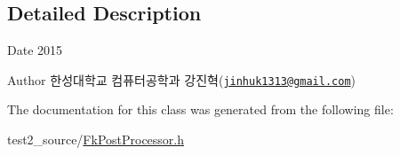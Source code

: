 \subsection{Detailed Description}
\begin{DoxyDate}{Date}
2015 
\end{DoxyDate}
\begin{DoxyAuthor}{Author}
한성대학교 컴퓨터공학과 강진혁(\href{mailto:jinhuk1313@gmail.com}{\tt jinhuk1313@gmail.\+com}) 
\end{DoxyAuthor}


The documentation for this class was generated from the following file\+:\begin{DoxyCompactItemize}
\item 
test2\+\_\+source/\hyperlink{_fk_post_processor_8h}{Fk\+Post\+Processor.\+h}\end{DoxyCompactItemize}
